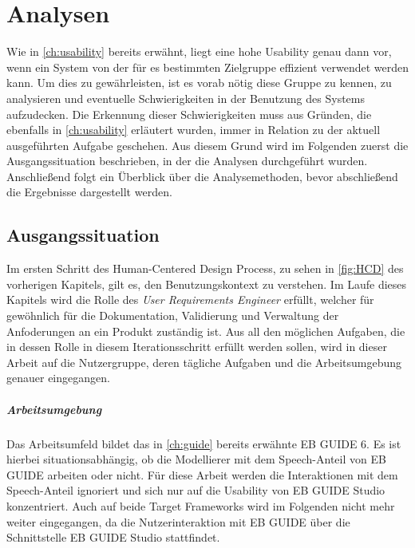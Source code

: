 \chapter{Analysen}\label{ch:method}

Wie in \cref{ch:usability} bereits erwähnt, liegt eine hohe Usability genau dann vor, wenn ein System von der für es bestimmten Zielgruppe effizient verwendet werden kann.\cite{Richter.2016}
Um dies zu gewährleisten, ist es vorab nötig diese Gruppe zu kennen, zu analysieren und eventuelle Schwierigkeiten in der Benutzung des Systems aufzudecken.
Die Erkennung dieser Schwierigkeiten muss aus Gründen, die ebenfalls in \cref{ch:usability} erläutert wurden, immer in Relation zu der aktuell ausgeführten Aufgabe geschehen.
Aus diesem Grund wird im Folgenden zuerst die Ausgangssituation beschrieben,  in der die Analysen durchgeführt wurden.
Anschließend folgt ein Überblick über die Analysemethoden, bevor abschließend die Ergebnisse dargestellt werden.

\section{Ausgangssituation}
Im ersten Schritt des Human-Centered Design Process, zu sehen in \cref{fig:HCD} des vorherigen Kapitels, gilt es, den Benutzungskontext zu verstehen.
Im Laufe dieses Kapitels wird die Rolle des \textit{User Requirements Engineer} erfüllt, welcher für gewöhnlich für die Dokumentation, Validierung und Verwaltung der Anfoderungen an ein Produkt zuständig ist.
Aus all den möglichen Aufgaben, die in dessen Rolle in diesem Iterationsschritt erfüllt werden sollen, wird in dieser Arbeit auf die Nutzergruppe, deren tägliche Aufgaben und die Arbeitsumgebung genauer eingegangen.

\paragraph{Arbeitsumgebung}
Das Arbeitsumfeld bildet das in \cref{ch:guide} bereits erwähnte EB GUIDE 6.
Es ist hierbei situationsabhängig, ob die Modellierer mit dem Speech-Anteil von EB GUIDE arbeiten oder nicht.
Für diese Arbeit werden die Interaktionen mit dem Speech-Anteil ignoriert und sich nur auf die Usability von EB GUIDE Studio konzentriert.
Auch auf beide Target Frameworks wird im Folgenden nicht mehr weiter eingegangen, da die Nutzerinteraktion mit EB GUIDE über die Schnittstelle EB GUIDE Studio stattfindet.

